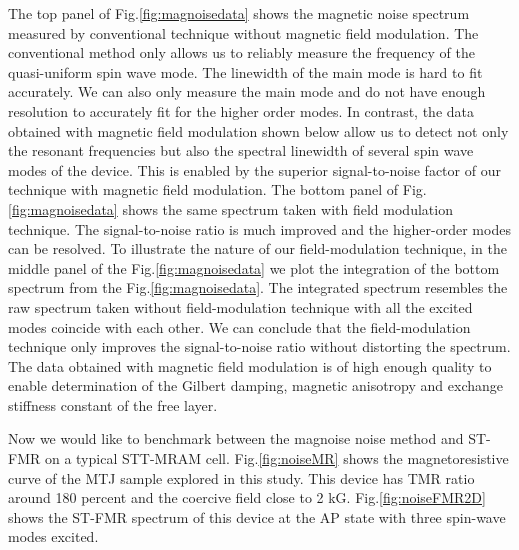 The top panel of Fig.\ref{fig:magnoisedata} shows the magnetic noise spectrum measured by conventional technique without magnetic field modulation. The conventional method only allows us to reliably measure the frequency of the quasi-uniform spin wave mode. The linewidth of the main mode is hard to fit accurately. We can also only measure the main mode and do not have enough resolution to accurately fit for the higher order modes. In contrast, the data obtained with magnetic field modulation shown below allow us to detect not only the resonant frequencies but also the spectral linewidth of several spin wave modes of the device. This is enabled by the superior signal-to-noise factor of our technique with magnetic field modulation. The bottom panel of Fig.\ref{fig:magnoisedata} shows the same spectrum taken with field modulation technique. The signal-to-noise ratio is much improved and the higher-order modes can be resolved. To illustrate the nature of our field-modulation technique, in the middle panel of the Fig.\ref{fig:magnoisedata} we plot the integration of the bottom spectrum from the Fig.\ref{fig:magnoisedata}. The integrated spectrum resembles the raw spectrum taken without field-modulation technique with all the excited modes coincide with each other. We can conclude that the field-modulation technique only improves the signal-to-noise ratio without distorting the spectrum. The data obtained with magnetic field modulation is of high enough quality to enable determination of the Gilbert damping, magnetic anisotropy and exchange stiffness constant of the free layer. 


Now we would like to benchmark between the magnoise noise method and ST-FMR on a typical STT-MRAM cell. Fig.\ref{fig:noiseMR} shows the magnetoresistive curve of the MTJ sample explored in this study. This device has TMR ratio around 180 percent and the coercive field close to 2 kG. Fig.\ref{fig:noiseFMR2D} shows the ST-FMR spectrum of this device at the AP state with three spin-wave modes excited. 

